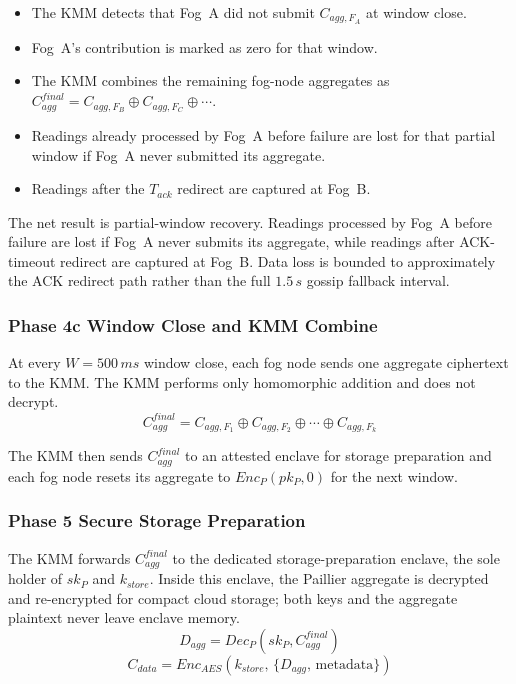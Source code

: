 \documentclass[conference]{IEEEtran}
\begin{document}
    \begin{itemize}
        \item The KMM detects that Fog~A did not submit $C_{agg,F_A}$ at window close.
        \item Fog~A's contribution is marked as zero for that window.
        \item The KMM combines the remaining fog-node aggregates as $C_{agg}^{final}=C_{agg,F_B}\oplus C_{agg,F_C}\oplus\cdots$.
        \item Readings already processed by Fog~A before failure are lost for that partial window if Fog~A never submitted its aggregate.
        \item Readings after the $T_{ack}$ redirect are captured at Fog~B.
    \end{itemize}

    The net result is partial-window recovery. Readings processed by Fog~A before failure are lost if Fog~A never submits its aggregate, while readings after ACK-timeout redirect are captured at Fog~B. Data loss is bounded to approximately the ACK redirect path rather than the full $1.5\,s$ gossip fallback interval.

    \subsubsection{\textbf{Phase 4c Window Close and KMM Combine}}

    At every $W=500\,ms$ window close, each fog node sends one aggregate ciphertext to the KMM. The KMM performs only homomorphic addition and does not decrypt.
    \begin{equation}
    C_{agg}^{final} = C_{agg,F_1} \oplus C_{agg,F_2} \oplus \cdots \oplus C_{agg,F_k}
    \end{equation}

    The KMM then sends $C_{agg}^{final}$ to an attested enclave for storage preparation and each fog node resets its aggregate to $Enc_P(pk_P,0)$ for the next window.

    \subsubsection{\textbf{Phase 5 Secure Storage Preparation}}

    The KMM forwards $C_{agg}^{final}$ to the dedicated storage-preparation enclave, the sole holder of $sk_P$ and $k_{store}$. Inside this enclave, the Paillier aggregate is decrypted and re-encrypted for compact cloud storage; both keys and the aggregate plaintext never leave enclave memory.
    \begin{equation}
    D_{agg} = Dec_P(sk_P, C_{agg}^{final})
    \end{equation}
    \begin{equation}
    C_{data} = Enc_{AES}(k_{store},\, \{D_{agg},\, \mathrm{metadata}\})
    \end{equation}
\end{document}
